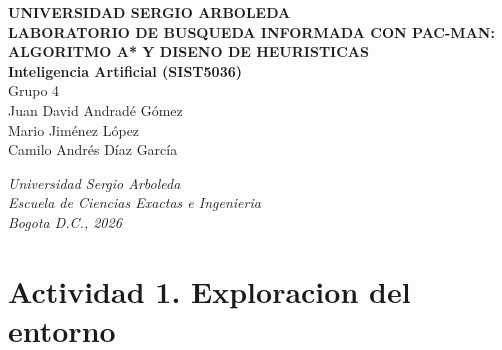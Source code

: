 \documentclass[12pt,a4paper]{article}
\begin{document}

\begin{titlepage}
\thispagestyle{empty}
\centering

\vspace*{0.5cm}

{\fontsize{13}{15}\selectfont\textbf{UNIVERSIDAD SERGIO ARBOLEDA}}\\[2.5cm]

{\fontsize{14}{17}\selectfont\textbf{LABORATORIO DE BUSQUEDA INFORMADA CON PAC-MAN:\\
ALGORITMO A* Y DISENO DE HEURISTICAS}}\\[3.5cm]

{\fontsize{12}{14}\selectfont\textbf{Inteligencia Artificial (SIST5036)}}\\[0.5cm]
{\fontsize{12}{14}\selectfont Grupo 4}\\[1.3cm]

{\fontsize{12}{14}\selectfont Juan David Andradé Gómez}\\[0.1cm]
{\fontsize{12}{14}\selectfont Mario Jiménez López}\\[0.1cm]
{\fontsize{12}{14}\selectfont Camilo Andrés Díaz García}\\[0.3cm]

\vfill

\begin{center}
    \textit{Universidad Sergio Arboleda}\\
    \textit{Escuela de Ciencias Exactas e Ingenieria}\\
    \textit{Bogota D.C., 2026}
\end{center}

\end{titlepage}

\newpage
\tableofcontents
\newpage

\section{Actividad 1. Exploracion del entorno}

\end{document}

